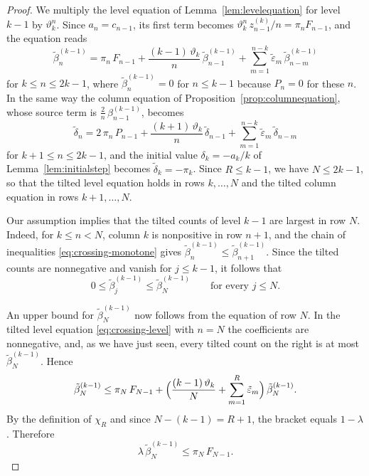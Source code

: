 \documentclass{amsart}
\theoremstyle{definition}
\theoremstyle{remark}
\numberwithin{equation}{section}
\begin{document}
\begin{proof}
We multiply the level equation of Lemma~\ref{lem:levelequation} for level $k-1$ by $\vartheta_k^n$. Since $a_n=c_{n-1}$, its first term becomes $\vartheta_k^n\,z^{(k)}_{n-1}/n=\pi_nF_{n-1}$, and the equation reads
\begin{equation}\label{eq:crossing-level}
\tilde\beta^{(k-1)}_n=\pi_n\,F_{n-1}+\frac{(k-1)\,\vartheta_k}{n}\,\tilde\beta^{(k-1)}_{n-1}+\sum_{m=1}^{n-k}\tilde\varepsilon_m\,\tilde\beta^{(k-1)}_{n-m}
\end{equation}
for $k\le n\le 2k-1$, where $\tilde\beta^{(k-1)}_n=0$ for $n\le k-1$ because $P_n=0$ for these $n$. In the same way the column equation of Proposition~\ref{prop:columnequation}, whose source term is $\frac{2}{n}\,\beta^{(k-1)}_{n-1}$, becomes
\begin{equation}\label{eq:crossing-step}
\tilde\delta_n=2\,\pi_n\,P_{n-1}+\frac{(k+1)\,\vartheta_k}{n}\,\tilde\delta_{n-1}+\sum_{m=1}^{n-k}\tilde\varepsilon_m\,\tilde\delta_{n-m}
\end{equation}
for $k+1\le n\le 2k-1$, and the initial value $\delta_k=-a_k/k$ of Lemma~\ref{lem:initialstep} becomes $\tilde\delta_k=-\pi_k$. Since $R\le k-1$, we have $N\le 2k-1$, so that the tilted level equation holds in rows $k,\dots,N$ and the tilted column equation in rows $k+1,\dots,N$.

Our assumption implies that the tilted counts of level $k-1$ are largest in row $N$. Indeed, for $k\le n<N$, column $k$ is nonpositive in row $n+1$, and the chain of inequalities \eqref{eq:crossing-monotone} gives $\tilde\beta^{(k-1)}_n\le\tilde\beta^{(k-1)}_{n+1}$. Since the tilted counts are nonnegative and vanish for $j\le k-1$, it follows that
\[
0\le\tilde\beta^{(k-1)}_j\le\tilde\beta^{(k-1)}_N\qquad\text{for every } j\le N .
\]

An upper bound for $\tilde\beta^{(k-1)}_N$ now follows from the equation of row $N$. In the tilted level equation \eqref{eq:crossing-level} with $n=N$ the coefficients are nonnegative, and, as we have just seen, every tilted count on the right is at most $\tilde\beta^{(k-1)}_N$. Hence
\[
\tilde\beta^{(k-1)}_N\le\pi_N\,F_{N-1}+\Bigl(\frac{(k-1)\,\vartheta_k}{N}+\sum_{m=1}^{R}\tilde\varepsilon_m\Bigr)\,\tilde\beta^{(k-1)}_N .
\]
By the definition of $\chi_R$ and since $N-(k-1)=R+1$, the bracket equals $1-\lambda$. Therefore
\begin{equation}\label{eq:crossing-top}
\lambda\,\tilde\beta^{(k-1)}_N\le\pi_N\,F_{N-1}.
\end{equation}


\end{proof}
\end{document}
